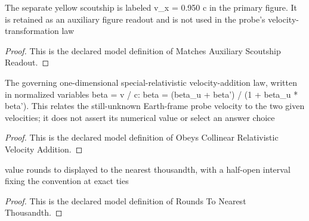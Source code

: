 \begin{definition}
  \label{def:physics:phyx-mini-0510:phyxminiproblems-problemphyxmini0510-matchesauxiliaryscoutshipreadout}
  The separate yellow scoutship is labeled v\_x = 0.950 c in the primary figure. It is retained as an auxiliary figure readout and is not used in the probe's velocity-transformation law
\end{definition}
\begin{proof}
  This is the declared model definition of Matches Auxiliary Scoutship Readout.
\end{proof}
\begin{definition}
  \label{def:physics:phyx-mini-0510:phyxminiproblems-problemphyxmini0510-obeyscollinearrelativisticvelocityaddition}
  The governing one-dimensional special-relativistic velocity-addition law, written in normalized variables beta = v / c: beta = (beta\_u + beta') / (1 + beta\_u * beta'). This relates the still-unknown Earth-frame probe velocity to the two given velocities; it does not assert its numerical value or select an answer choice
\end{definition}
\begin{proof}
  This is the declared model definition of Obeys Collinear Relativistic Velocity Addition.
\end{proof}
\begin{definition}
  \label{def:physics:phyx-mini-0510:phyxminiproblems-problemphyxmini0510-roundstonearestthousandth}
  value rounds to displayed to the nearest thousandth, with a half-open interval fixing the convention at exact ties
\end{definition}
\begin{proof}
  This is the declared model definition of Rounds To Nearest Thousandth.
\end{proof}
